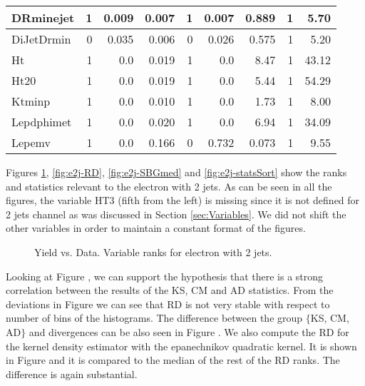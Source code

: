 \begin{table}[htbp]
\begin{center}
\begin{tabular}{|l|r|r|r|r|r|r|r|r|}
\textsf{DRminejet} & 1 & 0.009 & 0.007 & 1 & 0.007 & 0.889 & 1 & 5.70 \\ \hline
\textsf{DiJetDrmin} & 0 & 0.035 & 0.006 & 0 & 0.026 & 0.575 & 1 & 5.20 \\ \hline
\textsf{Ht} & 1 & 0.0 & 0.019 & 1 & 0.0 & 8.47 & 1 & 43.12 \\ \hline
\textsf{Ht20} & 1 & 0.0 & 0.019 & 1 & 0.0 & 5.44 & 1 & 54.29 \\ \hline
\textsf{Ktminp} & 1 & 0.0 & 0.010 & 1 & 0.0 & 1.73 & 1 & 8.00 \\ \hline
\textsf{Lepdphimet} & 1 & 0.0 & 0.020 & 1 & 0.0 & 6.94 & 1 & 34.09 \\ \hline
\textsf{Lepemv} & 1 & 0.0 & 0.166 & 0 & 0.732 & 0.073 & 1 & 9.55 \\ \hline
\end{tabular}
\end{center}
\label{tab:e2j-tests}
\end{table}


Figures \ref{fig:e2j-KSR}, \ref{fig:e2j-RD},  \ref{fig:e2j-SBGmed} and \ref{fig:e2j-statsSort} show the ranks and statistics relevant to the electron with 2 jets. As can be seen in all the figures, the variable \textsf{HT3} (fifth from the left) is missing since it is not defined for 2 jets channel as was discussed in Section \ref{sec:Variables}. We did not shift the other variables in order to maintain a constant format of the figures. 

\begin{figure}[htb]
    \centering
	\quad
    \caption{Yield vs. Data. Variable ranks for electron with 2 jets.}
     \label{fig:e2j-KSR}
\end{figure}	

Looking at Figure , we can support the hypothesis that there is a strong correlation between the results of the KS, CM and AD statistics. From the deviations in Figure  we can see that RD is not very stable with respect to number of bins of the histograms. The difference between the group $\lbrace$KS, CM, AD$\rbrace$ and \ren divergences can be also seen in Figure . We also compute the RD for the kernel density estimator with the epanechnikov quadratic kernel. It is shown in Figure  and it is compared to the median of the rest of the RD ranks. The difference is again substantial. 

